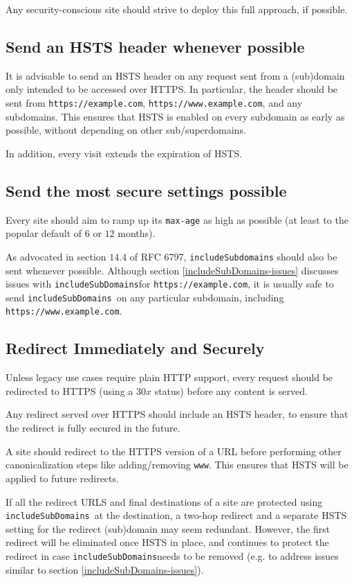 \documentclass[conference]{./IEEEtran}
\newcommand{\site}[1]{\texttt{#1}}
\newcommand{\code}[1]{\texttt{#1}}
\newcommand{\iSD}{{\code{includeSubDomains}}}
\newcommand{\genericsite}{example.com}
\newcommand{\s}{{\site{https://\genericsite}}}
\newcommand{\sw}{{\site{https://www.\genericsite}}}
\theoremstyle{plain}
\begin{document}
Any security-conscious site should strive to deploy this full approach, if possible.

\subsection{Send an HSTS header whenever possible}

It is advisable to send an HSTS header on any request sent from a (sub)domain only intended to be accessed over HTTPS. In particular, the header should be sent from \s, \sw, and any subdomains. This ensures that HSTS is enabled on every subdomain as early as possible, without depending on other sub/superdomains.

In addition, every visit extends the expiration of HSTS.

\subsection{Send the most secure settings possible}

Every site should aim to ramp up its \code{max-age} as high as possible (at least to the popular default of $6$ or $12$ months).

As advocated in section $14.4$ of RFC 6797\cite{rfc}, \code{includeSubdomains} should also be sent whenever possible. Although section \ref{includeSubDomains-issues} discusses issues with \iSD for \s, it is usually safe to send \iSD~on any particular subdomain, including \sw.

\subsection{Redirect Immediately and Securely}

Unless legacy use cases require plain HTTP support, every request should be redirected to HTTPS (using a $30x$ status) before any content is served.

Any redirect served over HTTPS should include an HSTS header, to ensure that the redirect is fully secured in the future.

A site should redirect to the HTTPS version of a URL before performing other canonicalization steps like adding/removing \code{www}. This ensures that HSTS will be applied to future redirects.

If all the redirect URLS and final destinations of a site are protected using \iSD~at the destination, a two-hop redirect and a separate HSTS setting for the redirect (sub)domain may seem redundant. However, the first redirect will be eliminated once HSTS in place, and continues to protect the redirect in case \iSD needs to be removed (e.g. to address issues similar to section \ref{includeSubDomains-issues}).
\end{document}
